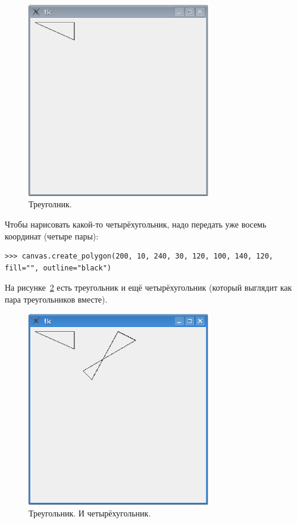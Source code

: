 \begin{figure}
\begin{center}
\includegraphics[width=80mm]{../en/figure41.eps}
\end{center}
\caption{Треуголник.}\label{fig41}
\end{figure}

Чтобы нарисовать какой-то четырёхугольник, надо передать уже восемь координат (четыре пары):

\begin{listing}
\begin{verbatim}
>>> canvas.create_polygon(200, 10, 240, 30, 120, 100, 140, 120, fill="", outline="black")
\end{verbatim}
\end{listing}

На рисунке \ref{fig42} есть треугольник и ещё четырёхугольник (который выглядит как пара треугольников вместе).

\begin{figure}
\begin{center}
\includegraphics[width=80mm]{../en/figure42.eps}
\end{center}
\caption{Треугольник. И четырёхугольник.}\label{fig42}
\end{figure}

